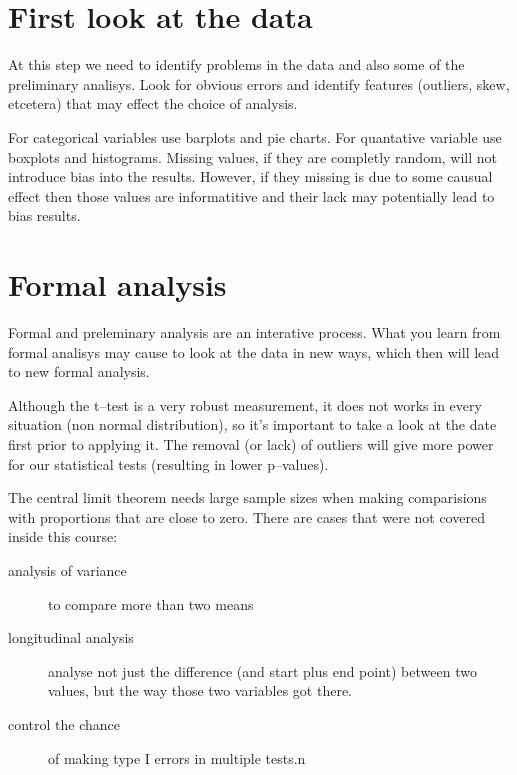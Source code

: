 \section{First look at the data}

At this step we need to identify problems in the data and also some of the
preliminary analisys. Look for obvious errors and identify features (outliers,
skew, etcetera) that may effect the choice of analysis. 

For categorical variables use barplots and pie charts. For quantative variable
use boxplots and histograms. Missing values, if they are completly random, will
not introduce bias into the results. However, if they missing is due to some
causual effect then those values are informatitive and their lack may
potentially lead to bias results.

\section{Formal analysis}

Formal and preleminary analysis are an interative process. What you learn from
formal analisys may cause to look at the data in new ways, which then will lead
to new formal analysis.

Although the t--test is a very robust measurement, it does not works in every
situation (non normal distribution), so it's important to take a look at the
date first prior to applying it. The removal (or lack) of outliers will give
more power for our statistical tests (resulting in lower p--values).

The central limit theorem needs large sample sizes when making comparisions with
proportions that are close to zero. There are cases that were not covered inside
this course: 

\begin{description}
  \item[analysis of variance] to compare more than two means
  \item[longitudinal analysis] analyse not just the difference (and start plus
  end point) between two values, but the way those two variables got there. 
  \item[control the chance] of making type I errors in multiple tests.n
\end{description}
